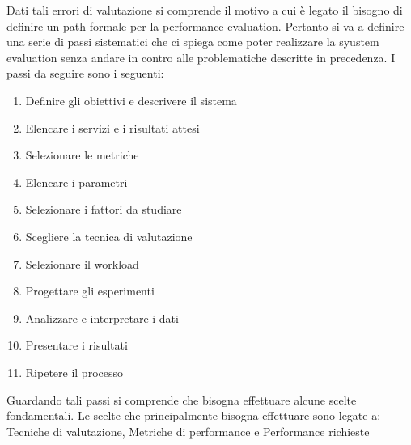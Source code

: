 Dati tali errori di valutazione si comprende il motivo a cui è legato il bisogno di definire un path formale per la performance evaluation. Pertanto si va a definire una serie di passi sistematici che ci spiega come poter realizzare la syustem evaluation senza andare in contro alle problematiche descritte in precedenza. I passi da seguire sono i seguenti:
\begin{enumerate}
  \item Definire gli obiettivi e descrivere il sistema
  \item Elencare i servizi e i risultati attesi
  \item Selezionare le metriche
  \item Elencare i parametri
  \item Selezionare i fattori da studiare
  \item Scegliere la tecnica di valutazione
  \item Selezionare il workload
  \item Progettare gli esperimenti
  \item Analizzare e interpretare i dati
  \item Presentare i risultati
  \item Ripetere il processo
\end{enumerate}

Guardando tali passi si comprende che bisogna effettuare alcune scelte fondamentali. Le scelte che principalmente bisogna effettuare sono legate a: Tecniche di valutazione, Metriche di performance e Performance richieste

